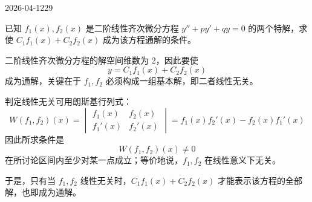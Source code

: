 \begin{mistake}{2026-04-12}{29}

\begin{problemcontent}
已知 \( f_1(x), f_2(x) \) 是二阶线性齐次微分方程 \( y''+py'+qy=0 \) 的两个特解，求使 \( C_1f_1(x)+C_2f_2(x) \) 成为该方程通解的条件。
\end{problemcontent}

\begin{solutioncontent}
二阶线性齐次微分方程的解空间维数为 2，因此要使
\[
y=C_1f_1(x)+C_2f_2(x)
\]
成为通解，关键在于 \(f_1,f_2\) 必须构成一组基本解，即二者线性无关。

判定线性无关可用朗斯基行列式：
\[
W(f_1,f_2)(x)=
\begin{vmatrix}
f_1(x) & f_2(x) \\
f_1'(x) & f_2'(x)
\end{vmatrix}
=f_1(x)f_2'(x)-f_2(x)f_1'(x)
\]
因此所求条件是
\[
W(f_1,f_2)(x)\neq 0
\]
在所讨论区间内至少对某一点成立；等价地说，\(f_1,f_2\) 在线性意义下无关。

于是，只有当 \(f_1,f_2\) 线性无关时，\(C_1f_1(x)+C_2f_2(x)\) 才能表示该方程的全部解，也即成为通解。
\end{solutioncontent}


\end{mistake}
